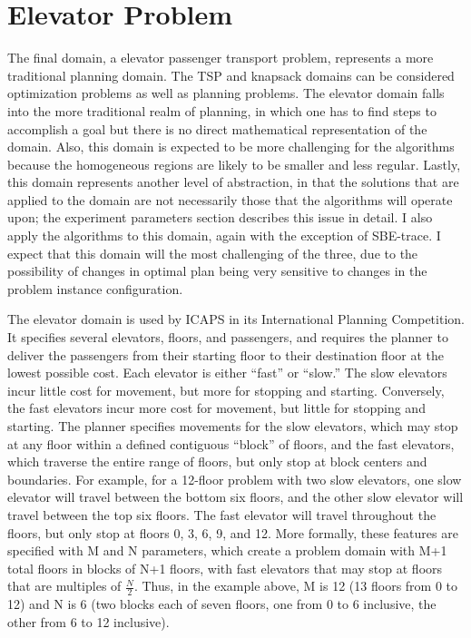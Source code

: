 

\section{Elevator Problem}

The final domain, a elevator passenger transport problem,  represents a more traditional planning domain.  The TSP and knapsack domains can be considered optimization problems as well as planning problems.  The elevator domain  falls into the more traditional realm of planning, in which one has to find steps to accomplish a goal but  there is no direct mathematical representation of the domain.  Also, this domain is expected to be more challenging for the algorithms because the homogeneous regions are likely to be smaller and less regular.  Lastly, this domain represents  another level of abstraction, in that the solutions that are applied to the domain are not necessarily those that the algorithms will operate upon; the experiment parameters section describes this issue in detail.  I also apply the algorithms to this domain, again with the exception of SBE-trace.  I expect that this domain will the most challenging of the three, due to the possibility of changes in optimal plan being very sensitive to changes in the problem instance configuration.



The elevator domain is used by ICAPS in its International Planning Competition.  It specifies several elevators, floors, and passengers, and requires the planner to deliver the passengers from their starting floor to their destination floor at the lowest possible cost.  Each elevator is either ``fast'' or ``slow.''  The slow elevators incur little cost for movement, but more for stopping and starting.  Conversely, the fast elevators incur more cost for movement, but little for stopping and starting.  The planner specifies movements for the slow elevators, which may stop at any floor within a defined contiguous ``block'' of floors, and the fast elevators, which traverse the entire range of  floors, but only stop at block centers and boundaries.  For example, for a 12-floor problem with two slow elevators, one slow elevator will travel between the bottom six floors, and the other slow elevator will travel between the top six floors.  The fast elevator will travel throughout the floors, but only stop at floors 0, 3, 6, 9, and 12.  More formally, these features are specified with  M and N parameters, which create a problem domain with  M+1 total floors in blocks of N+1 floors, with fast elevators that may stop at floors that are multiples of $\frac{N}{2}$.  Thus, in the example above, M is 12 (13 floors from 0 to 12) and N is 6 (two blocks each of seven floors, one from 0 to 6 inclusive, the other from 6 to 12 inclusive).  

